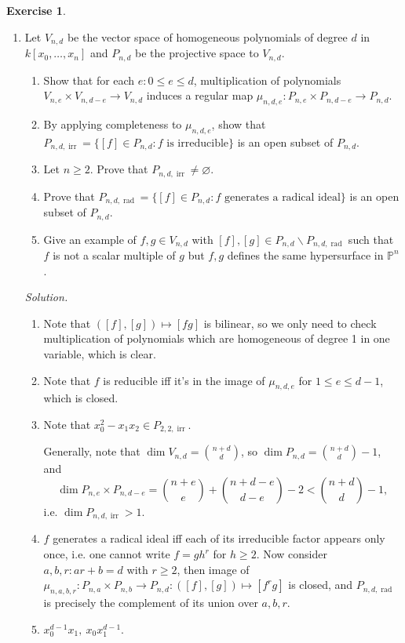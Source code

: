 \documentclass{article}
\newcommand{\p}{\mathbb{P}}
\newcommand{\irr}{\operatorname{irr}}
\newcommand{\rad}{\operatorname{rad}}
\theoremstyle{definition}
\newtheorem{exe}[defn]{Exercise}
\begin{document}
\begin{exe}
\begin{enumerate}
\item Let $V_{n,d}$ be the vector space of homogeneous polynomials of degree $d$ in $k[x_0,\ldots,x_n]$ and $P_{n,d}$ be the projective space to $V_{n,d}$.
\begin{enumerate}
\item Show that for each $e:0\leq e\leq d$, multiplication of polynomials $V_{n,e}\times V_{n,d-e}\rightarrow V_{n,d}$ induces a regular map $\mu_{n,d,e}:P_{n,e}\times P_{n,d-e}\rightarrow P_{n,d}$.
\item By applying completeness to $\mu_{n,d,e}$, show that $P_{n,d,\irr}=\{[f]\in P_{n,d}:f\text{ is irreducible}\}$ is an open subset of $P_{n,d}$.
\item Let $n\geq 2$. Prove that $P_{n,d,\irr}\neq\varnothing$.
\item Prove that $P_{n,d,\rad}=\{[f]\in P_{n,d}:f\text{ generates a radical ideal}\}$ is an open subset of $P_{n,d}$.
\item Give an example of $f,g\in V_{n,d}$ with $[f],[g]\in P_{n,d}\backslash P_{n,d,\rad}$ such that $f$ is not a scalar multiple of $g$ but $f,g$ defines the same hypersurface in $\p^n$.
\end{enumerate}

\textit{Solution.} \begin{enumerate}
\item Note that $([f],[g])\mapsto [fg]$ is bilinear, so we only need to check multiplication of polynomials which are homogeneous of degree 1 in one variable, which is clear.
\item Note that $f$ is reducible iff it's in the image of $\mu_{n,d,e}$ for $1\leq e\leq d-1$, which is closed.
\item Note that $x_0^2-x_1x_2\in P_{2,2,\irr}$.

Generally, note that $\dim V_{n,d}=\binom{n+d}{d}$, so $\dim P_{n,d}=\binom{n+d}{d}-1$, and
\[
\dim P_{n,e}\times P_{n,d-e}=\binom{n+e}{e}+\binom{n+d-e}{d-e}-2<\binom{n+d}{d}-1,
\]
i.e. $\dim P_{n,d,\irr}>1$.
\item $f$ generates a radical ideal iff each of its irreducible factor appears only once, i.e. one cannot write $f=gh^r$ for $h\geq 2$. Now consider $a,b,r:ar+b=d$ with $r\geq 2$, then image of $\mu_{n,a,b,r}:P_{n,a}\times P_{n,b}\rightarrow P_{n,d}:([f],[g])\mapsto [f^rg]$ is closed, and $P_{n,d,\rad}$ is precisely the complement of its union over $a,b,r$.
\item $x_0^{d-1}x_1,\ x_0x_1^{d-1}$.
\end{enumerate}


\end{enumerate}
\end{exe}
\end{document}
